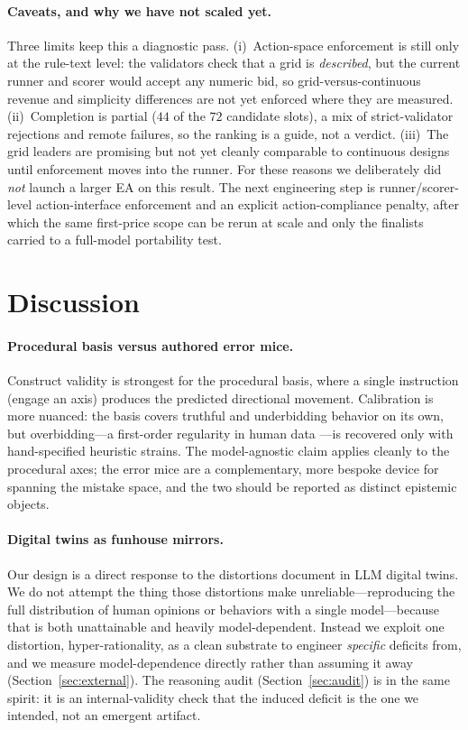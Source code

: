 \documentclass[12pt]{article}
\begin{document}
\paragraph{Caveats, and why we have not scaled yet.} Three limits keep this a
diagnostic pass. (i)~Action-space enforcement is still only at the rule-text level:
the validators check that a grid is \emph{described}, but the current runner and
scorer would accept any numeric bid, so grid-versus-continuous revenue and simplicity
differences are not yet enforced where they are measured. (ii)~Completion is partial
($44$ of the $72$ candidate slots), a mix of strict-validator rejections and remote
failures, so the ranking is a guide, not a verdict. (iii)~The grid leaders are
promising but not yet cleanly comparable to continuous designs until enforcement
moves into the runner. For these reasons we deliberately did \emph{not} launch a
larger EA on this result. The next engineering step is runner/scorer-level
action-interface enforcement and an explicit action-compliance penalty, after which
the same first-price scope can be rerun at scale and only the finalists carried to a
full-model portability test.

\section{Discussion}
\label{sec:discussion}

\paragraph{Procedural basis versus authored error mice.} Construct validity is
strongest for the procedural basis, where a single instruction (engage an axis)
produces the predicted directional movement. Calibration is more nuanced: the basis
covers truthful and underbidding behavior on its own, but overbidding---a
first-order regularity in human data \citep{kagellevin1993}---is recovered only with
hand-specified heuristic strains. The model-agnostic claim applies cleanly to the
procedural axes; the error mice are a complementary, more bespoke device for
spanning the mistake space, and the two should be reported as distinct epistemic
objects.

\paragraph{Digital twins as funhouse mirrors.} Our design is a direct response to
the distortions \citet{peng2025funhouse} document in LLM digital twins. We do not
attempt the thing those distortions make unreliable---reproducing the full
distribution of human opinions or behaviors with a single model---because that is
both unattainable and heavily model-dependent. Instead we exploit one distortion,
hyper-rationality, as a clean substrate to engineer \emph{specific} deficits from,
and we measure model-dependence directly rather than assuming it away
(Section~\ref{sec:external}). The reasoning audit (Section~\ref{sec:audit}) is in
the same spirit: it is an internal-validity check that the induced deficit is the
one we intended, not an emergent artifact.
\end{document}
